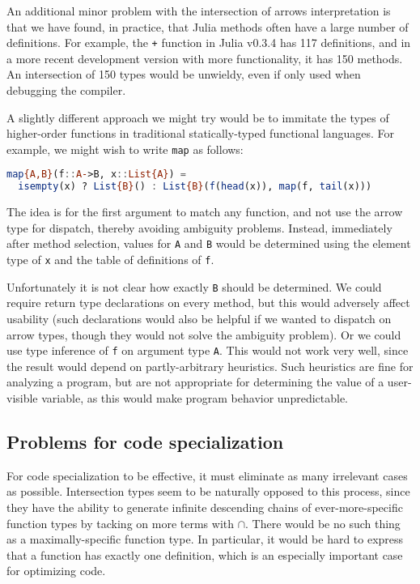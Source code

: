 An additional minor problem with the intersection of arrows
interpretation is that we have found, in practice, that Julia methods
often have a large number of definitions. For example, the \texttt{+}
function in Julia v0.3.4 has 117 definitions, and in a more recent
development version with more functionality, it has 150 methods. An
intersection of 150 types would be unwieldy, even if only
used when debugging the compiler.

A slightly different approach we might try would be to immitate
the types of higher-order functions in traditional
statically-typed functional languages. For example, we might wish
to write \texttt{map} as follows:

\begin{singlespace}
\begin{lstlisting}[language=julia]
map{A,B}(f::A->B, x::List{A}) =
  isempty(x) ? List{B}() : List{B}(f(head(x)), map(f, tail(x)))
\end{lstlisting}
\end{singlespace}

The idea is for the first argument to match any function, and not use
the arrow type for dispatch, thereby avoiding ambiguity problems.
Instead, immediately after method selection, values for \texttt{A} and
\texttt{B} would be determined using the element type of \texttt{x}
and the table of definitions of \texttt{f}.

Unfortunately it is not clear how exactly \texttt{B} should be
determined. We could require return type declarations on every method,
but this would adversely affect usability (such declarations would also
be helpful if we wanted to dispatch on arrow types, though they would
not solve the ambiguity problem). Or we could use type inference
of \texttt{f} on argument type \texttt{A}. This would not work very
well, since the result would depend on partly-arbitrary heuristics.
Such heuristics are fine for analyzing a program, but
are not appropriate for determining the value of a user-visible
variable, as this would make program behavior unpredictable.

\subsection{Problems for code specialization}

For code specialization to be effective, it must eliminate as many
irrelevant cases as possible. Intersection types seem to be naturally
opposed to this process, since they have the ability to
generate infinite descending chains of ever-more-specific function
types by tacking on more terms with $\cap$. There would be no such
thing as a maximally-specific function type. In particular, it would be
hard to express that a function has exactly one definition,
which is an especially important case for optimizing code.

